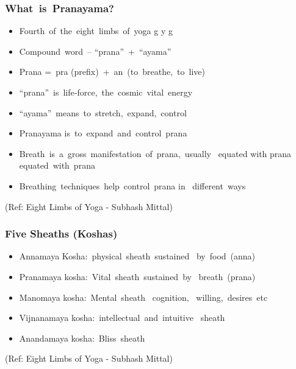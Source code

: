 \begin{frame}[fragile]\frametitle{What is Pranayama?}


	\begin{itemize}
	\item  Fourth of the eight limbs of yoga g y g
	\item  Compound word – ``prana'' + ``ayama''
	\item  Prana = pra (prefix) + an (to breathe, to live)
	\item  ``prana'' is life‐force, the cosmic vital energy
	\item  ``ayama'' means to stretch, expand, control
	\item  Pranayama is to expand and control prana
	\item  Breath is a gross manifestation of prana, usually 
equated with prana equated with prana
	\item  Breathing techniques help control prana in 
different ways
	\end{itemize}

\tiny{(Ref: Eight Limbs of Yoga - Subhash Mittal)}

\end{frame}

\begin{frame}[fragile]\frametitle{Five Sheaths (Koshas) }


	\begin{itemize}
	\item  Annamaya Kosha: physical sheath sustained 
by food (anna)
	\item Pranamaya kosha: Vital sheath sustained by 
breath (prana)
	\item Manomaya kosha: Mental sheath  cognition, 
willing, desires etc
	\item Vijnanamaya kosha: intellectual and intuitive 
sheath
	\item Anandamaya kosha: Bliss sheath
	\end{itemize}

\tiny{(Ref: Eight Limbs of Yoga - Subhash Mittal)}

\end{frame}


